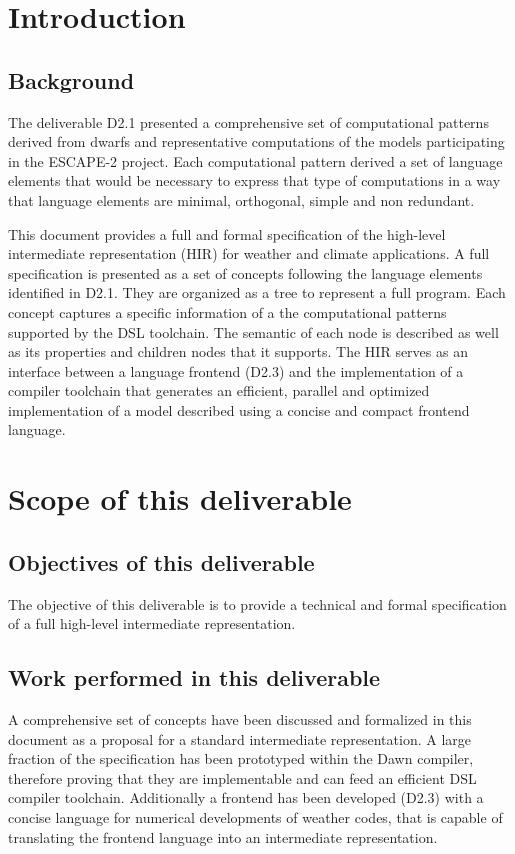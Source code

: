 \section{Introduction}

\subsection{Background}
The deliverable D2.1 presented a comprehensive 
set of computational patterns derived from dwarfs and representative 
computations of the models participating in the ESCAPE-2 project.
Each computational pattern derived a set of language elements
that would be necessary to express that type of computations
in a way that language elements are minimal, orthogonal, simple 
and non redundant. 

This document provides a full and formal specification of 
the high-level intermediate representation (HIR) for weather and climate applications.
A full specification is presented as a set of concepts following
the language elements identified in D2.1. They
are organized as a tree to represent a full program. 
Each concept captures a specific information of a the computational
patterns supported by the DSL toolchain.
The semantic of each node is described as well as its properties 
and children nodes that it supports. 
The HIR serves as an interface between a language frontend (D2.3)
and the implementation of a compiler toolchain that
generates an efficient, parallel and optimized implementation 
of a model described using a concise and compact frontend language. 


\section{Scope of this deliverable}
\subsection{Objectives of this deliverable} 
The objective of this deliverable is to provide a technical 
and formal specification of a full high-level intermediate
representation.
\subsection{Work performed in this deliverable} 
A comprehensive set of concepts have been discussed and formalized
in this document as a proposal for a standard intermediate representation. 
A large fraction of the specification has been prototyped within
the Dawn compiler, therefore proving that they are implementable and
can feed an efficient DSL compiler toolchain. 
Additionally a frontend has been developed (D2.3) with a concise
language for numerical developments of weather codes, that is
capable of translating the frontend language into an intermediate 
representation. 
